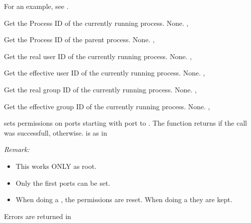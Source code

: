 For an example, see .

{ Get the Process ID of the currently running process.}
{None.}
{, }




{ Get the Process ID of the parent process.}
{None.}
{, }



{ Get the real user ID of the currently running process.}
{None.}
{,  }



{ Get the effective user ID of the currently running process.}
{None.}
{,  }



{ Get the real group ID of the currently running process.}
{None.}
{,  }



{ Get the effective group ID of the currently running process.}
{None.}
{,  }



{
  sets permissions on  ports starting with port  to 
  . The function returns  if the call was successfull,
   otherwise.   is as in \var{} 

{\em Remark:}
\begin{itemize}
\item This works ONLY as root.
\item Only the first  ports can be set.
\item When doing a , the permissions are reset. When doing a
 they are kept.
\end{itemize}
}
{Errors are returned in }{}

